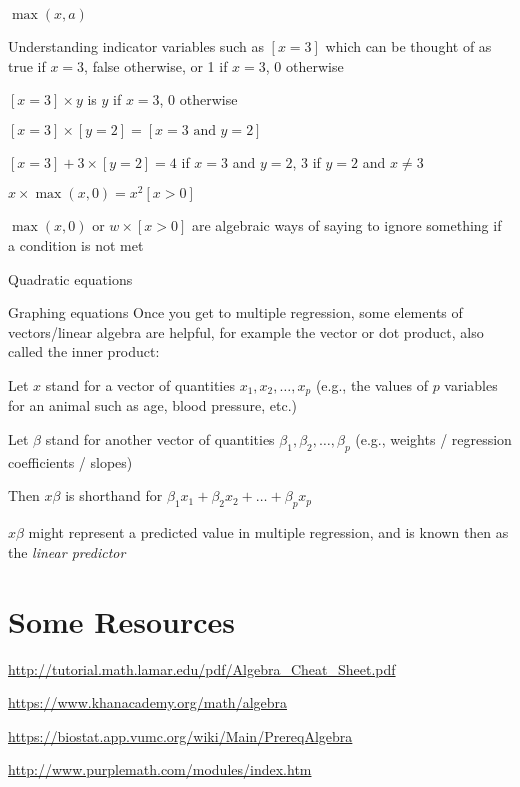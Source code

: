   $\max(x, a)$
\item Understanding indicator variables such as $[x=3]$ which can be
  thought of as true if $x=3$, false otherwise, or 1 if $x=3$, 0
  otherwise
 \bi
 \item $[x=3]\times y$ is $y$ if $x=3$, 0 otherwise
 \item $[x=3]\times[y=2] = [x=3 \textrm{~and~} y=2]$
 \item $[x=3] + 3\times [y=2] = 4$ if $x=3$ and $y=2$, $3$ if $y=2$
   and $x\neq 3$
 \item $x\times \max(x, 0) = x^{2}[x>0]$
 \item $\max(x, 0)$ or $w \times [x>0]$ are algebraic ways of saying
   to ignore something if a condition is not met
 \ei
\item Quadratic equations
\item Graphing equations
\ei
Once you get to multiple regression, some elements of vectors/linear
algebra are helpful, for example the vector or dot product, also
called the inner product:
\bi
\item Let $x$ stand for a vector of quantities $x_{1}, x_{2}, \ldots,
  x_{p}$ (e.g., the values of $p$ variables for an animal such as age,
  blood pressure, etc.)
\item Let $\beta$ stand for another vector of quantities $\beta_{1},
  \beta_{2}, \ldots, \beta_{p}$ (e.g., weights / regression
  coefficients / slopes)
\item Then $x\beta$ is shorthand for $\beta_{1}x_{1}+\beta_{2}x_{2} +
  \ldots + \beta_{p}x_{p}$
\item $x\beta$ might represent a predicted value in multiple
  regression, and is known then as the \emph{linear predictor}
\ei

\section{Some Resources}
\bi
\item \url{http://tutorial.math.lamar.edu/pdf/Algebra_Cheat_Sheet.pdf}
\item \url{https://www.khanacademy.org/math/algebra}
\item \url{https://biostat.app.vumc.org/wiki/Main/PrereqAlgebra}
\item \url{http://www.purplemath.com/modules/index.htm}
\ei
